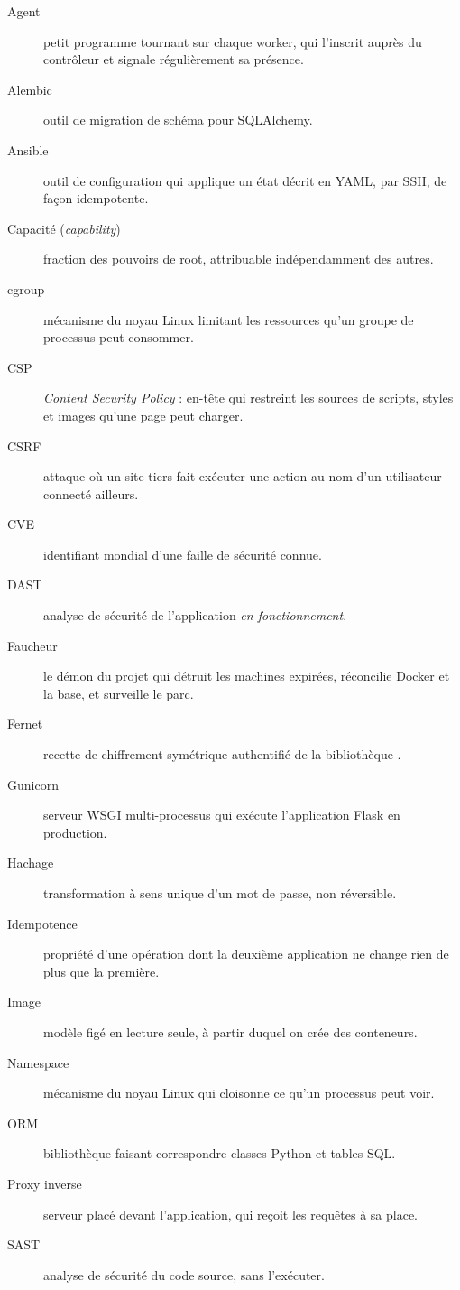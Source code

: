 \begin{description}
\item[Agent] petit programme tournant sur chaque worker, qui l'inscrit auprès
  du contrôleur et signale régulièrement sa présence.
\item[Alembic] outil de migration de schéma pour SQLAlchemy.
\item[Ansible] outil de configuration qui applique un état décrit en YAML, par
  SSH, de façon idempotente.
\item[Capacité (\emph{capability})] fraction des pouvoirs de root, attribuable
  indépendamment des autres.
\item[cgroup] mécanisme du noyau Linux limitant les ressources qu'un groupe de
  processus peut consommer.
\item[CSP] \emph{Content Security Policy} : en-tête qui restreint les sources
  de scripts, styles et images qu'une page peut charger.
\item[CSRF] attaque où un site tiers fait exécuter une action au nom d'un
  utilisateur connecté ailleurs.
\item[CVE] identifiant mondial d'une faille de sécurité connue.
\item[DAST] analyse de sécurité de l'application \emph{en fonctionnement}.
\item[Faucheur] le démon du projet qui détruit les machines expirées,
  réconcilie Docker et la base, et surveille le parc.
\item[Fernet] recette de chiffrement symétrique authentifié de la bibliothèque
  .
\item[Gunicorn] serveur WSGI multi-processus qui exécute l'application Flask en
  production.
\item[Hachage] transformation à sens unique d'un mot de passe, non réversible.
\item[Idempotence] propriété d'une opération dont la deuxième application ne
  change rien de plus que la première.
\item[Image] modèle figé en lecture seule, à partir duquel on crée des
  conteneurs.
\item[Namespace] mécanisme du noyau Linux qui cloisonne ce qu'un processus peut
  voir.
\item[ORM] bibliothèque faisant correspondre classes Python et tables SQL.
\item[Proxy inverse] serveur placé devant l'application, qui reçoit les
  requêtes à sa place.
\item[SAST] analyse de sécurité du code source, sans l'exécuter.

\end{description}
